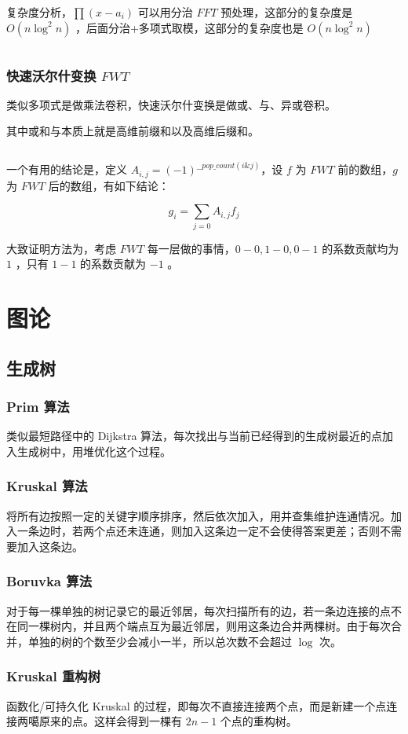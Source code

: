 \documentclass[UTF-8]{ctexart}
\newcommand{\cpp}[1]{\inputminted[bgcolor=bg,breaklines,breakanywhere=true]{c++}{#1}}
\begin{document}
			复杂度分析，$\prod (x-a_i)$ 可以用分治 $FFT$ 预处理，这部分的复杂度是$O(n\log^2n)$ ，后面分治+多项式取模，这部分的复杂度也是 $O(n\log^2n)$
			\cpp{code//Math//polyget.cpp}
			\subsubsection{快速沃尔什变换 $FWT$}
			类似多项式是做乘法卷积，快速沃尔什变换是做或、与、异或卷积。
			
			其中或和与本质上就是高维前缀和以及高维后缀和。
			\cpp{code//Math//fwt.cpp}
			
			一个有用的结论是，定义 $A _ {i,j}=(-1)^{\_\_pop\_count(i\&j)}$，设 $f$ 为 $FWT$ 前的数组，$g$ 为 $FWT$ 后的数组，有如下结论：
			
			$$g _ i=\sum _ {j=0} A _ {i,j}f _ j$$
			
			大致证明方法为，考虑 $FWT$ 每一层做的事情，$0-0,1-0,0-1$ 的系数贡献均为 $1$ ，只有 $1-1$ 的系数贡献为 $-1$ 。
			
	\newpage
	\section{图论}
		\subsection{生成树}
			\subsubsection{Prim 算法}
			类似最短路径中的 Dijkstra 算法，每次找出与当前已经得到的生成树最近的点加入生成树中，用堆优化这个过程。
			\subsubsection{Kruskal 算法}
			将所有边按照一定的关键字顺序排序，然后依次加入，用并查集维护连通情况。加入一条边时，若两个点还未连通，则加入这条边一定不会使得答案更差；否则不需要加入这条边。
			\subsubsection{Boruvka 算法}
			对于每一棵单独的树记录它的最近邻居，每次扫描所有的边，若一条边连接的点不在同一棵树内，并且两个端点互为最近邻居，则用这条边合并两棵树。由于每次合并，单独的树的个数至少会减小一半，所以总次数不会超过 $\log$ 次。
			\subsubsection{Kruskal 重构树}
			函数化/可持久化 Kruskal 的过程，即每次不直接连接两个点，而是新建一个点连接两噶原来的点。这样会得到一棵有 $2n-1$ 个点的重构树。
			
\end{document}
